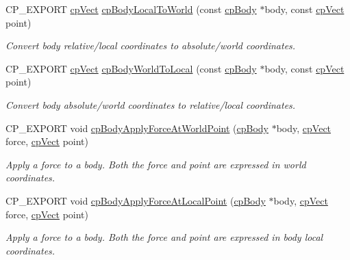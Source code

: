 \begin{DoxyCompactItemize}
C\+P\+\_\+\+E\+X\+P\+O\+RT \hyperlink{structcpVect}{cp\+Vect} \hyperlink{group__cpBody_ga35e470ae1d4c0df38fe7145d029f8399}{cp\+Body\+Local\+To\+World} (const \hyperlink{structcpBody}{cp\+Body} $\ast$body, const \hyperlink{structcpVect}{cp\+Vect} point)
\begin{DoxyCompactList}\small\item\em Convert body relative/local coordinates to absolute/world coordinates. \end{DoxyCompactList}\item 
\mbox{\label{group__cpBody_ga1a098b8788c6d910a8048300ac3f5c77}} 
C\+P\+\_\+\+E\+X\+P\+O\+RT \hyperlink{structcpVect}{cp\+Vect} \hyperlink{group__cpBody_ga1a098b8788c6d910a8048300ac3f5c77}{cp\+Body\+World\+To\+Local} (const \hyperlink{structcpBody}{cp\+Body} $\ast$body, const \hyperlink{structcpVect}{cp\+Vect} point)
\begin{DoxyCompactList}\small\item\em Convert body absolute/world coordinates to relative/local coordinates. \end{DoxyCompactList}\item 
\mbox{\label{group__cpBody_ga94ce4fa01218cbec17338829804c1025}} 
C\+P\+\_\+\+E\+X\+P\+O\+RT void \hyperlink{group__cpBody_ga94ce4fa01218cbec17338829804c1025}{cp\+Body\+Apply\+Force\+At\+World\+Point} (\hyperlink{structcpBody}{cp\+Body} $\ast$body, \hyperlink{structcpVect}{cp\+Vect} force, \hyperlink{structcpVect}{cp\+Vect} point)
\begin{DoxyCompactList}\small\item\em Apply a force to a body. Both the force and point are expressed in world coordinates. \end{DoxyCompactList}\item 
\mbox{\label{group__cpBody_ga3441a367681abd6074fa2fe351038c66}} 
C\+P\+\_\+\+E\+X\+P\+O\+RT void \hyperlink{group__cpBody_ga3441a367681abd6074fa2fe351038c66}{cp\+Body\+Apply\+Force\+At\+Local\+Point} (\hyperlink{structcpBody}{cp\+Body} $\ast$body, \hyperlink{structcpVect}{cp\+Vect} force, \hyperlink{structcpVect}{cp\+Vect} point)
\begin{DoxyCompactList}\small\item\em Apply a force to a body. Both the force and point are expressed in body local coordinates. \end{DoxyCompactList}\item 

\end{DoxyCompactItemize}
